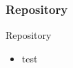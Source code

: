 \documentclass{beamer}
\begin{document}
		
		
%					
%				
%				
%		
%				
		
		\subsubsection{Repository}
		\begin{frame}{Repository}
			\begin{itemize}
				\item test
				
			\end{itemize}
		\end{frame}
		
\end{document}
